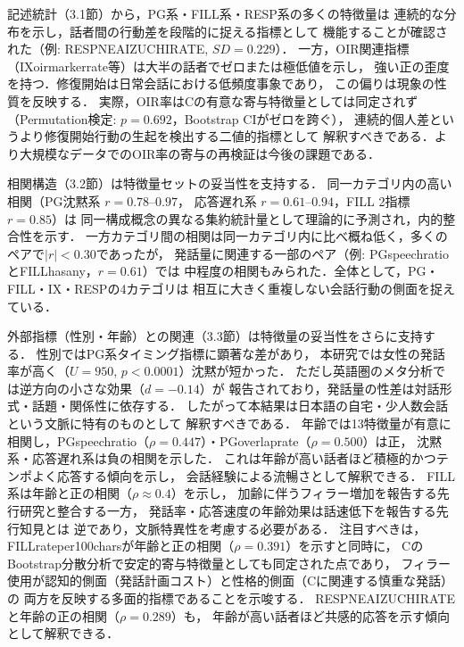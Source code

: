 \documentclass[dvipdfmx,11pt,a4paper]{bxjsarticle}
\renewcommand{\_}{\paperorigunderscore\allowbreak}%
\begin{document}
記述統計（3.1節）から，PG系・FILL系・RESP系の多くの特徴量は
連続的な分布を示し，話者間の行動差を段階的に捉える指標として
機能することが確認された（例: RESP\_NE\_AIZUCHI\_RATE, $SD = 0.229$）．
一方，OIR関連指標（IX\_oirmarker\_rate等）は大半の話者でゼロまたは極低値を示し，
強い正の歪度を持つ．修復開始は日常会話における低頻度事象であり，
この偏りは現象の性質を反映する．
実際，OIR率はCの有意な寄与特徴量としては同定されず
（Permutation検定: $p = 0.692$，Bootstrap CIがゼロを跨ぐ），
連続的個人差というより修復開始行動の生起を検出する二値的指標として
解釈すべきである．より大規模なデータでのOIR率の寄与の再検証は今後の課題である．

相関構造（3.2節）は特徴量セットの妥当性を支持する．
同一カテゴリ内の高い相関（PG沈黙系 $r = 0.78$--$0.97$，
応答遅れ系 $r = 0.61$--$0.94$，FILL 2指標 $r = 0.85$）は
同一構成概念の異なる集約統計量として理論的に予測され，内的整合性を示す．
一方カテゴリ間の相関は同一カテゴリ内に比べ概ね低く，多くのペアで$|r| < 0.30$であったが，
発話量に関連する一部のペア（例: PG\_speech\_ratioとFILL\_has\_any，$r = 0.61$）では
中程度の相関もみられた．全体として，PG・FILL・IX・RESPの4カテゴリは
相互に大きく重複しない会話行動の側面を捉えている．

外部指標（性別・年齢）との関連（3.3節）は特徴量の妥当性をさらに支持する．
性別ではPG系タイミング指標に顕著な差があり，
本研究では女性の発話率が高く（$U = 950$, $p < 0.0001$）沈黙が短かった．
ただし英語圏のメタ分析\cite{leaper2007}では逆方向の小さな効果（$d = -0.14$）が
報告されており，発話量の性差は対話形式・話題・関係性に依存する\cite{bortfeld2001}．
したがって本結果は日本語の自宅・少人数会話という文脈に特有のものとして
解釈すべきである．
年齢では13特徴量が有意に相関し，PG\_speech\_ratio（$\rho = 0.447$）・PG\_overlap\_rate（$\rho = 0.500$）は正，
沈黙系・応答遅れ系は負の相関を示した．
これは年齢が高い話者ほど積極的かつテンポよく応答する傾向を示し，
会話経験による流暢さとして解釈できる．
FILL系は年齢と正の相関（$\rho \approx 0.4$）を示し，
加齢に伴うフィラー増加を報告する先行研究\cite{bortfeld2001,horton2010}と整合する一方，
発話率・応答速度の年齢効果は話速低下を報告する先行知見\cite{horton2010}とは
逆であり，文脈特異性を考慮する必要がある．
注目すべきは，FILL\_rate\_per\_100charsが年齢と正の相関（$\rho = 0.391$）を示すと同時に，
CのBootstrap分散分析で安定的寄与特徴量としても同定された点であり，
フィラー使用が認知的側面（発話計画コスト）と性格的側面（Cに関連する慎重な発話）の
両方を反映する多面的指標であることを示唆する．
RESP\_NE\_AIZUCHI\_RATEと年齢の正の相関（$\rho = 0.289$）も，
年齢が高い話者ほど共感的応答を示す傾向として解釈できる．
\end{document}
